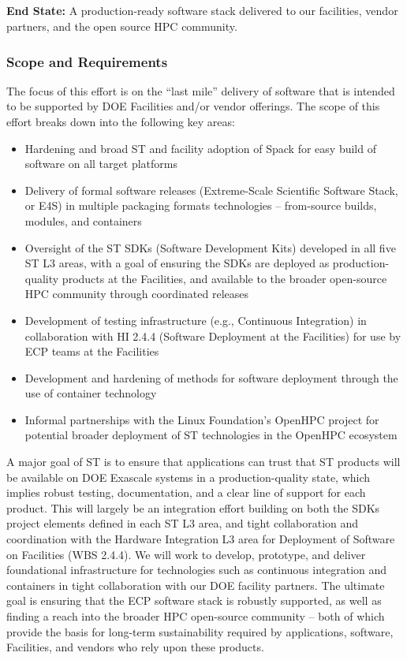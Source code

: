 \subsection{ \ecosystem}\label{subsect:ecosystem}

\textbf{End State:} A production-ready software stack delivered to our facilities, vendor partners, and the open source HPC community.

\subsubsection{Scope and Requirements}
The focus of this effort is on the ``last mile'' delivery of software that is intended to be supported by DOE Facilities and/or vendor offerings. The scope of this effort breaks down into the following key areas:
\begin{itemize}
	\item Hardening and broad ST and facility adoption of Spack for easy build of software on all target platforms
        \item Delivery of formal software releases (Extreme-Scale Scientific Software Stack, or E4S) in multiple packaging formats technologies -- from-source builds, modules, and containers
	\item Oversight of the ST SDKs (Software Development Kits) developed in all five ST L3 areas, with a goal of ensuring the SDKs are deployed as production-quality products at the Facilities, and available to the broader open-source HPC community through coordinated releases
	\item Development of testing infrastructure (e.g., Continuous Integration) in collaboration with HI 2.4.4 (Software Deployment at the Facilities) for use by ECP teams at the Facilities
	\item Development and hardening of methods for software deployment through the use of container technology
	\item Informal partnerships with the Linux Foundation's OpenHPC project for potential broader deployment of ST technologies in the OpenHPC ecosystem
\end{itemize}

A major goal of ST is to ensure that applications can trust that ST products will be available on DOE Exascale systems in a production-quality state, which implies robust testing, documentation, and a clear line of support for each product. This will largely be an integration effort building on both the SDKs project elements defined in each ST L3 area, and tight collaboration and coordination with the Hardware Integration L3 area for Deployment of Software on Facilities (WBS 2.4.4). We will work to develop, prototype, and deliver foundational infrastructure for technologies such as continuous integration and containers in tight collaboration with our DOE facility partners. The ultimate goal is ensuring that the ECP software stack is robustly supported, as well as finding a reach into the broader HPC open-source community -- both of which provide the basis for long-term sustainability required by applications, software, Facilities, and vendors who rely upon these products.

